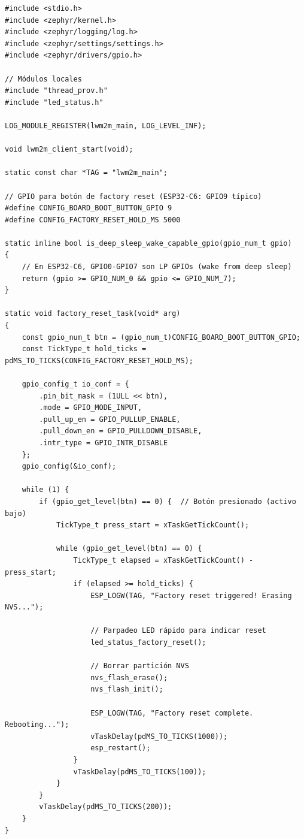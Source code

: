 \begin{verbatim}
#include <stdio.h>
#include <zephyr/kernel.h>
#include <zephyr/logging/log.h>
#include <zephyr/settings/settings.h>
#include <zephyr/drivers/gpio.h>

// Módulos locales
#include "thread_prov.h"
#include "led_status.h"

LOG_MODULE_REGISTER(lwm2m_main, LOG_LEVEL_INF);

void lwm2m_client_start(void);

static const char *TAG = "lwm2m_main";

// GPIO para botón de factory reset (ESP32-C6: GPIO9 típico)
#define CONFIG_BOARD_BOOT_BUTTON_GPIO 9
#define CONFIG_FACTORY_RESET_HOLD_MS 5000

static inline bool is_deep_sleep_wake_capable_gpio(gpio_num_t gpio)
{
    // En ESP32-C6, GPIO0-GPIO7 son LP GPIOs (wake from deep sleep)
    return (gpio >= GPIO_NUM_0 && gpio <= GPIO_NUM_7);
}

static void factory_reset_task(void* arg)
{
    const gpio_num_t btn = (gpio_num_t)CONFIG_BOARD_BOOT_BUTTON_GPIO;
    const TickType_t hold_ticks = pdMS_TO_TICKS(CONFIG_FACTORY_RESET_HOLD_MS);
    
    gpio_config_t io_conf = {
        .pin_bit_mask = (1ULL << btn),
        .mode = GPIO_MODE_INPUT,
        .pull_up_en = GPIO_PULLUP_ENABLE,
        .pull_down_en = GPIO_PULLDOWN_DISABLE,
        .intr_type = GPIO_INTR_DISABLE
    };
    gpio_config(&io_conf);
    
    while (1) {
        if (gpio_get_level(btn) == 0) {  // Botón presionado (activo bajo)
            TickType_t press_start = xTaskGetTickCount();
            
            while (gpio_get_level(btn) == 0) {
                TickType_t elapsed = xTaskGetTickCount() - press_start;
                if (elapsed >= hold_ticks) {
                    ESP_LOGW(TAG, "Factory reset triggered! Erasing NVS...");
                    
                    // Parpadeo LED rápido para indicar reset
                    led_status_factory_reset();
                    
                    // Borrar partición NVS
                    nvs_flash_erase();
                    nvs_flash_init();
                    
                    ESP_LOGW(TAG, "Factory reset complete. Rebooting...");
                    vTaskDelay(pdMS_TO_TICKS(1000));
                    esp_restart();
                }
                vTaskDelay(pdMS_TO_TICKS(100));
            }
        }
        vTaskDelay(pdMS_TO_TICKS(200));
    }
}


\end{verbatim}
